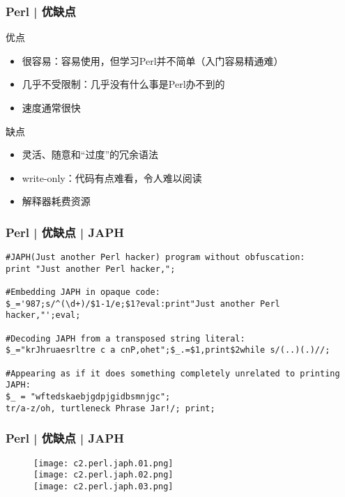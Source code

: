 \begin{frame}
  \frametitle{Perl | 优缺点}
  \begin{block}{优点}
    \begin{itemize}
      \item 很容易：容易使用，但学习Perl并不简单（入门容易精通难）
      \item 几乎不受限制：几乎没有什么事是Perl办不到的
      \item 速度通常很快
    \end{itemize}
  \end{block}
  \pause
  \begin{block}{缺点}
    \begin{itemize}
      \item 灵活、随意和“过度”的冗余语法
      \item write-only：代码有点难看，令人难以阅读
      \item 解释器耗费资源
    \end{itemize}
  \end{block}
\end{frame}

\begin{frame}[fragile]
  \frametitle{Perl | 优缺点 | JAPH}
\begin{lstlisting}[basicstyle=\small\tt]
#JAPH(Just another Perl hacker) program without obfuscation:
print "Just another Perl hacker,";

#Embedding JAPH in opaque code:
$_='987;s/^(\d+)/$1-1/e;$1?eval:print"Just another Perl hacker,"';eval;

#Decoding JAPH from a transposed string literal:
$_="krJhruaesrltre c a cnP,ohet";$_.=$1,print$2while s/(..)(.)//;

#Appearing as if it does something completely unrelated to printing JAPH:
$_ = "wftedskaebjgdpjgidbsmnjgc";
tr/a-z/oh, turtleneck Phrase Jar!/; print;
\end{lstlisting}
\end{frame}

\begin{frame}
  \frametitle{Perl | 优缺点 | JAPH}
  \begin{figure}
    \centering
    \texttt{[image: c2.perl.japh.01.png]}\\
    \vspace{1em}
    \texttt{[image: c2.perl.japh.02.png]}\\
    \vspace{1em}
    \texttt{[image: c2.perl.japh.03.png]}
  \end{figure}
\end{frame}

